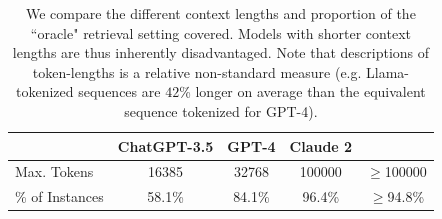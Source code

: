 \begin{table}[ht]
    \centering
    \caption{
    We compare the different context lengths and proportion of the ``oracle" retrieval setting covered.
    Models with shorter context lengths are thus inherently disadvantaged.
    Note that descriptions of token-lengths is a relative non-standard measure (e.g. Llama-tokenized sequences are $42$\% longer on average than the equivalent sequence tokenized for GPT-4).
    }
    \begin{tabular}{lcccc}
    \toprule
                           & ChatGPT-3.5 & GPT-4 & Claude 2 & \swellama{} \\
    \midrule
    Max. Tokens  & \num{16385} & \num{32768} & \num{100000} & $\ge$\num{100000} \\
    \% of Instances   & 58.1\% & 84.1\% & 96.4\% & $\ge$94.8\%  \\
    \bottomrule
    \end{tabular}
    \label{tab:model-context-comparision}
\end{table}